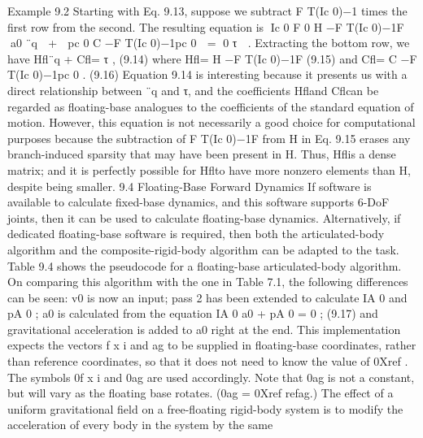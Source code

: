Example 9.2 Starting with Eq. 9.13, suppose we subtract F T(Ic 0)−1 times the first row from the second. The resulting equation is Ic 0 F 0 H −F T(Ic 0)−1F  a0 ¨q  +  pc 0 C −F T(Ic 0)−1pc 0  = 0 τ  . Extracting the bottom row, we have Hfl¨q + Cfl= τ , (9.14) where Hfl= H −F T(Ic 0)−1F (9.15) and Cfl= C −F T(Ic 0)−1pc 0 . (9.16) Equation 9.14 is interesting because it presents us with a direct relationship between ¨q and τ, and the coefficients Hfland Cflcan be regarded as floating-base analogues to the coefficients of the standard equation of motion. However, this equation is not necessarily a good choice for computational purposes because the subtraction of F T(Ic 0)−1F from H in Eq. 9.15 erases any branch-induced sparsity that may have been present in H. Thus, Hflis a dense matrix; and it is perfectly possible for Hflto have more nonzero elements than H, despite being smaller. 9.4 Floating-Base Forward Dynamics If software is available to calculate fixed-base dynamics, and this software supports 6-DoF joints, then it can be used to calculate floating-base dynamics. Alternatively, if dedicated floating-base software is required, then both the articulated-body algorithm and the composite-rigid-body algorithm can be adapted to the task. Table 9.4 shows the pseudocode for a floating-base articulated-body algorithm. On comparing this algorithm with the one in Table 7.1, the following differences can be seen: v0 is now an input; pass 2 has been extended to calculate IA 0 and pA 0 ; a0 is calculated from the equation IA 0 a0 + pA 0 = 0 ; (9.17) and gravitational acceleration is added to a0 right at the end. This implementation expects the vectors f x i and ag to be supplied in floating-base coordinates, rather than reference coordinates, so that it does not need to know the value of 0Xref . The symbols 0f x i and 0ag are used accordingly. Note that 0ag is not a constant, but will vary as the floating base rotates. (0ag = 0Xref refag.) The effect of a uniform gravitational field on a free-floating rigid-body system is to modify the acceleration of every body in the system by the same

